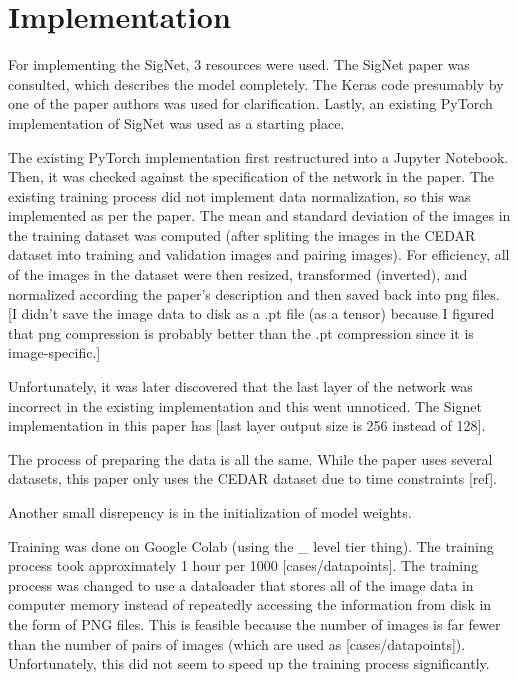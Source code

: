 \section{Implementation}\label{sec:implementation}

For implementing the SigNet, 3 resources were used.
The SigNet paper was consulted, which describes the model completely\cite{sig_net}.
The Keras code presumably by one of the paper authors was used for clarification\cite{GitHub_sounakdey}.
Lastly, an existing PyTorch implementation of SigNet was used as a starting place\cite{GitHub_signet_pytorch}.

The existing PyTorch implementation first restructured into a Jupyter Notebook.
Then, it was checked against the specification of the network in the paper.
The existing training process did not implement data normalization, so this was implemented as per the paper.
The mean and standard deviation of the images in the training dataset was computed (after spliting the images in the CEDAR dataset into training and validation images and pairing images).
For efficiency, all of the images in the dataset were then resized, transformed (inverted), and normalized according the paper's description and then saved back into png files.
[I didn't save the image data to disk as a .pt file (as a tensor) because I figured that png compression is probably better than the .pt compression since it is image-specific.]

Unfortunately, it was later discovered that the last layer of the network was incorrect in the existing implementation and this went unnoticed.
The Signet implementation in this paper has [last layer output size is 256 instead of 128].

The process of preparing the data is all the same.
While the paper uses several datasets, this paper only uses the CEDAR dataset due to time constraints [ref].

Another small disrepency is in the initialization of model weights.

Training was done on Google Colab (using the \_ level tier thing).
The training process took approximately 1 hour per 1000 [cases/datapoints].
The training process was changed to use a dataloader that stores all of the image data in computer memory instead of repeatedly accessing the information from disk in the form of PNG files.
This is feasible because the number of images is far fewer than the number of pairs of images (which are used as [cases/datapoints]).
Unfortunately, this did not seem to speed up the training process significantly.

